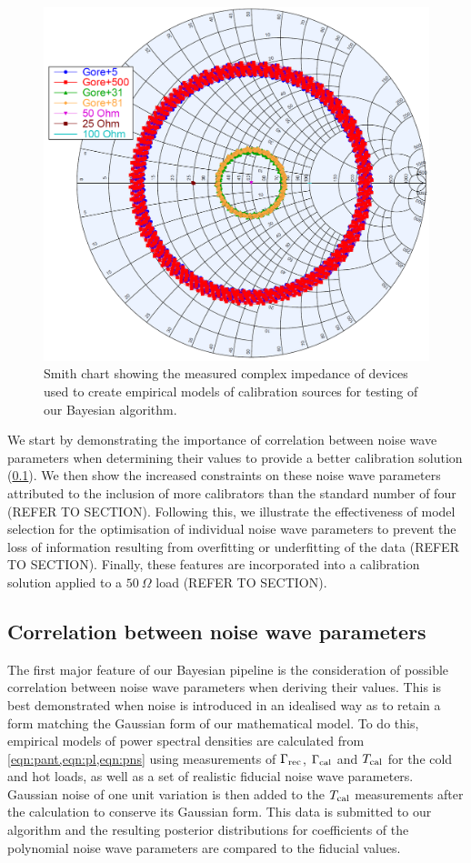 \begin{figure}
    \centering
    \includegraphics[width=.5\columnwidth]{sim_data_smith}
    \caption{Smith chart showing the measured complex impedance of devices used to create empirical models of calibration sources for testing of our Bayesian algorithm.
    \label{fig:sim_data_smith}}
\end{figure}

We start by demonstrating the importance of correlation between noise wave parameters when determining their values to provide a better calibration solution (\cref{sec:correlation}). We then show the increased constraints on these noise wave parameters attributed to the inclusion of more calibrators than the standard number of four (REFER TO SECTION). Following this, we illustrate the effectiveness of model selection for the optimisation of individual noise wave parameters to prevent the loss of information resulting from overfitting or underfitting of the data (REFER TO SECTION). Finally, these features are incorporated into a calibration solution applied to a $50 \ \Omega$ load (REFER TO SECTION).


\subsection{Correlation between noise wave parameters}\label{sec:correlation}
The first major feature of our Bayesian pipeline is the consideration of possible correlation between noise wave parameters when deriving their values. This is best demonstrated when noise is introduced in an idealised way as to retain a form matching the Gaussian form of our mathematical model. To do this, empirical models of power spectral densities are calculated from \cref{eqn:pant,eqn:pl,eqn:pns} using measurements of $\Gamma_{\mathrm{rec}}$, $\Gamma_{\mathrm{cal}}$ and $T_{\mathrm{cal}}$ for the cold and hot loads, as well as a set of realistic fiducial noise wave parameters. Gaussian noise of one unit variation is then added to the $T_{\mathrm{cal}}$ measurements after the calculation to conserve its Gaussian form. This data is submitted to our algorithm and the resulting posterior distributions for coefficients of the polynomial noise wave parameters are compared to the fiducial values.


